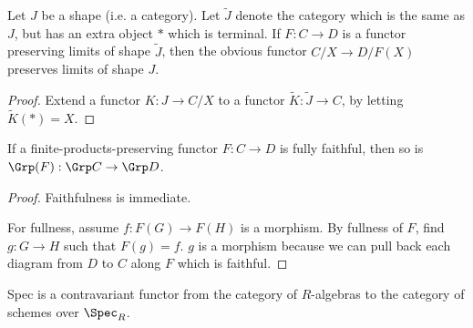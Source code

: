 \begin{proposition}
  \label{0-over-lim}
  \uses{}
  \leanok

  Let $J$ be a shape (i.e. a category). Let $\widetilde J$ denote the category which is the same as $J$, but has an extra object $*$ which is terminal.
  If $F : C \to D$ is a functor preserving limits of shape $\widetilde J$, then the obvious functor $C / X \to D / F(X)$ preserves limits of shape $J$.
\end{proposition}
\begin{proof}
  \uses{}
  \leanok

  Extend a functor $K\colon  J \to C / X$ to a functor $\widetilde K\colon \widetilde J \to C$, by letting $\widetilde K (*) = X$.
\end{proof}


\begin{proposition}
  \label{0-full-faithful-grp}
  \uses{}
  \leanok

  If a finite-products-preserving functor $F : C \to D$ is fully faithful, then so is $\Grp(F) : \Grp C \to \Grp D$.
\end{proposition}
\begin{proof}
  \uses{}
  \leanok

  Faithfulness is immediate.

  For fullness, assume $f : F(G) \to F(H)$ is a morphism. By fullness of $F$, find $g : G \to H$ such that $F(g) = f$. $g$ is a morphism because we can pull back each diagram from $D$ to $C$ along $F$ which is faithful.
\end{proof}


\begin{definition}
  \label{0-spec-alg}
  \uses{}
  \leanok

  Spec is a contravariant functor from the category of $R$-algebras to the category of schemes over $\Spec_R$.
\end{definition}


